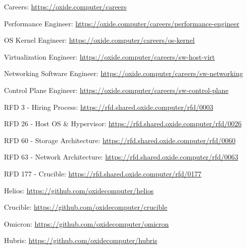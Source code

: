 \documentclass[11pt,letterpaper]{article}
\begin{document}
\begin{flushleft}

Careers: \url{https://oxide.computer/careers}

Performance Engineer: \url{https://oxide.computer/careers/performance-engineer}

OS Kernel Engineer: \url{https://oxide.computer/careers/os-kernel}

Virtualization Engineer: \url{https://oxide.computer/careers/sw-host-virt}

Networking Software Engineer: \url{https://oxide.computer/careers/sw-networking}

Control Plane Engineer: \url{https://oxide.computer/careers/sw-control-plane}

RFD 3 - Hiring Process: \url{https://rfd.shared.oxide.computer/rfd/0003}

RFD 26 - Host OS \& Hypervisor: \url{https://rfd.shared.oxide.computer/rfd/0026}

RFD 60 - Storage Architecture: \url{https://rfd.shared.oxide.computer/rfd/0060}

RFD 63 - Network Architecture: \url{https://rfd.shared.oxide.computer/rfd/0063}

RFD 177 - Crucible: \url{https://rfd.shared.oxide.computer/rfd/0177}

Helios: \url{https://github.com/oxidecomputer/helios}

Crucible: \url{https://github.com/oxidecomputer/crucible}

Omicron: \url{https://github.com/oxidecomputer/omicron}

Hubris: \url{https://github.com/oxidecomputer/hubris}

\end{flushleft}
\end{document}
